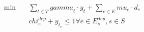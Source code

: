 \begin{align}
  \min\quad & \sum_{t \in T} \mathit{gamma}_{t} \cdot y_{t} + \sum_{e \in E} \mathit{mu}_{e} \cdot d_{e} \tag{eq\_0002} \\
  & \mathit{chi}_{e}^{\mathit{dep}} + y_{t_{e}} \leq 1 \forall e \in E_{s}^{\mathit{dep}} , s \in S \tag{eq\_0027} \\
\end{align}
